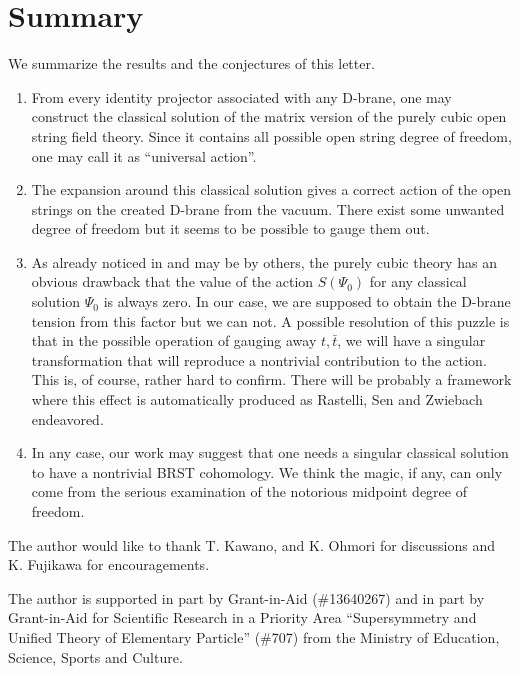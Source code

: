 \documentclass[a4paper,12pt]{article}
\begin{document}
\section{Summary}
We summarize the results and the conjectures of this letter.
\begin{enumerate}
 \item From every identity projector associated with any D-brane,
one may construct the classical solution of 
the matrix version of the purely cubic open string field theory.
Since it contains all possible open string degree of freedom, 
one may call it as ``universal action''.
 \item The expansion around this classical solution gives a correct
action of the open strings on the created D-brane from the vacuum.
There exist some unwanted degree of freedom but it seems to be
possible to gauge them out.
\item As already noticed in \cite{r-RSZ1} and may be by others,
the purely cubic theory has an obvious drawback that the value
of the action $S(\Psi_0)$ for any classical solution $\Psi_0$
is always zero.  In our case, we are supposed to obtain the
D-brane tension from this factor but we can not.  
A possible resolution of this puzzle is that in the 
possible operation of
gauging away $t,\bar t$, we will have a singular transformation
that will reproduce a nontrivial contribution to the action.
This is, of course, rather hard to confirm.  There will be
probably a framework where this effect is automatically produced
as Rastelli, Sen and Zwiebach endeavored.
\item In any case, our work may suggest that one needs 
a singular classical solution to have a nontrivial 
BRST cohomology. We think the magic, if any,
can only come from the serious examination of
the notorious midpoint degree of freedom.
\end{enumerate}

\vskip 5mm

The author would like to thank T. Kawano, and K. Ohmori for
discussions and K. Fujikawa for encouragements.

The author is supported in part by Grant-in-Aid (\#13640267)
and in part by Grant-in-Aid for Scientific Research
in a Priority Area ``Supersymmetry and Unified Theory of 
Elementary Particle'' (\#707) from the Ministry of Education,
Science, Sports and Culture.



%
\end{document}
